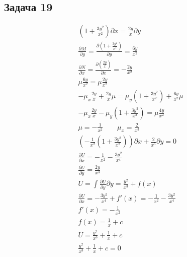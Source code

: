 \subsection*{Задача 19}
\begin{gather*}
	\left(1 + \frac{3y^2}{x^2}\right) \partial x = \frac{2y}{x} \partial y\\
	\frac{\partial M}{\partial y} = \frac{\partial (1 + \frac{3y^2}{x^2})}{\partial y} = \frac{6y}{x^2}\\
	\frac{\partial N}{\partial x} = \frac{\partial (\frac{2y}{x})}{\partial x} = -\frac{2y}{x^2}\\
	\mu \frac{6y}{x^2} = \mu \frac{2y}{x^2}\\
	-\mu_x \frac{2y}{x} + \frac{2y}{x} \mu = \mu_y (1+ \frac{3y^2}{x^2}) + \frac{6y}{x^2} \mu\\
	-\mu_x \frac{2y}{x} - \mu_y (1+\frac{3y^2}{x^2}) = \mu \frac{4y}{x^2}\\
	\mu = -\frac{1}{x^2}\qquad \mu_x = \frac{2}{x^3}\\
	(-\frac{1}{x^2}(1+\frac{3y^2}{x^2})) \partial x + \frac{2}{x^5} \partial y = 0\\
	\frac{\partial U}{\partial x} = -\frac{1}{x^2} - \frac{3y^2}{x^4}\\
	\frac{\partial U}{\partial y} = \frac{2y}{x^3}\\
	U = \int \frac{\partial U}{\partial y} \partial y = \frac{y^2}{x^3} + f(x)\\
	\frac{\partial U}{\partial x} = -\frac{3y^2}{x^4} + f'(x) = -\frac{1}{x^2} - \frac{3y^2}{x^4}\\
	f'(x) = -\frac{1}{x^2}\\
	f(x) = \frac{1}{x} + c\\
	U = \frac{y^2}{x^3} + \frac{1}{x} + c\\
	\frac{y^2}{x^3} + \frac{1}{x} + c = 0
\end{gather*}


